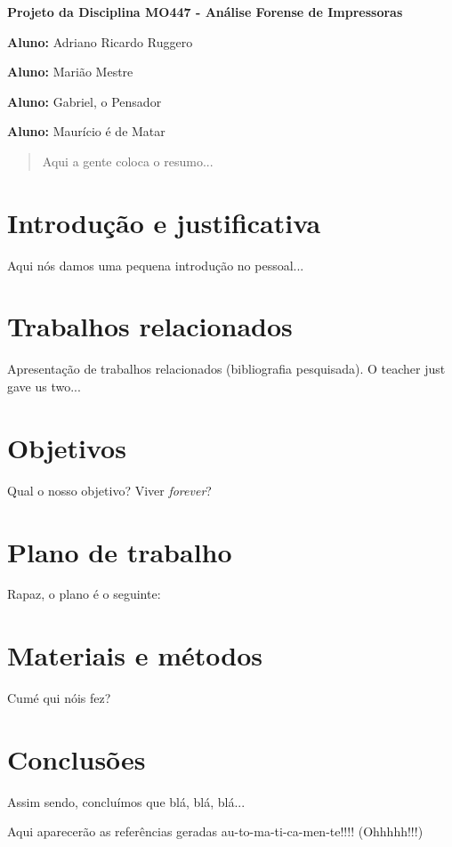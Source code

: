 \documentclass[12pt,twoside,a4paper]{article}
\begin{document}
\vskip 15mm

\begin{center} 
\textbf{Projeto da Disciplina MO447 - Análise Forense de Impressoras}

\end{center}

\vskip 5mm

\textbf{Aluno:} Adriano Ricardo Ruggero

\textbf{Aluno:} Marião Mestre

\textbf{Aluno:} Gabriel, o Pensador

\textbf{Aluno:} Maurício é de Matar

\vskip 20mm

\begin{abstract}

Aqui a gente coloca o resumo...

\end{abstract}

\newpage
\pagestyle{plain}
\headheight 0.0cm
\headsep 0.0cm
\footskip 2.2cm

\section{Introdução e justificativa}
\label{sec:introduction}

Aqui nós damos uma pequena introdução no pessoal...

\section{Trabalhos relacionados}
\label{sec:related}

Apresentação de trabalhos relacionados (bibliografia pesquisada).	O teacher just gave us two...


\section{Objetivos}
\label{sec:objects}

Qual o nosso objetivo? Viver \textit{forever}?

\section{Plano de trabalho}
\label{sec:plan}

Rapaz, o plano é o seguinte:
 
\section{Materiais e métodos}
\label{sec:materials}

Cumé qui nóis fez?	

\section{Conclusões}
\label{sec:conclusions}

Assim sendo, concluímos que blá, blá, blá...

{}


Aqui aparecerão as referências geradas au-to-ma-ti-ca-men-te!!!! (Ohhhhh!!!)
\end{document}
